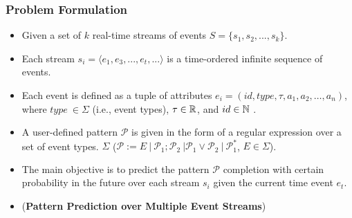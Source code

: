 \frame
{
	\frametitle{Problem Formulation}
	
	\begin{itemize}[]
		\item<only@1>Given a set of $k$ real-time streams of events $S = \{ s_1,s_2, ..., s_k\}$.
		
		\item<only@1> Each stream  $s_i=\langle e_1,e_3,...,e_t,...\rangle$  is a time-ordered infinite sequence of events.
		
		\item<only@1> Each event is defined as a tuple of attributes $e_i = (id,type,\tau,a_1,a_2,\ldots,a_n)$, where $type\ \in  \Sigma$ (i.e., event types), $\tau\in\mathbb{R}$, and  $id\in\mathbb{N}$ . 
		\item<only@1> A user-defined pattern $\mathcal{P}$ is given in the form of a regular expression over a set of event types. $\Sigma$ ($\mathcal{P} := E\ |\ \mathcal{P}_{1} ; \mathcal{P}_{2}\ | \mathcal{P}_{1} \vee \mathcal{P}_{2}\ |\ \mathcal{P}_{1}^{*}$,  $E \in \Sigma$).
		
		
		\item<2->The main objective is to predict the pattern $\mathcal{P}$ completion with certain probability in the future over each stream $s_i$ given the current time event $e_t$. 
		
		\item<3-> (\textbf{Pattern Prediction over Multiple Event Streams})
	\end{itemize}
}

%
%	


